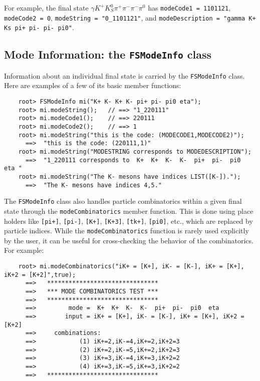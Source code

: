 \documentclass[11pt]{article}
\begin{document}
For example, the final state $\gamma K^+ K^0_S \pi^+ \pi^- \pi^- \pi^0$ has {\tt modeCode1 = 1101121}, {\tt modeCode2 = 0}, {\tt modeString = "0\_1101121"}, and {\tt modeDescription = "gamma K+ Ks pi+ pi- pi- pi0"}. 

\subsection{Mode Information: the {\tt FSModeInfo} class}
\label{sec:modeinfo}

Information about an individual final state is carried by the {\tt FSModeInfo} class.  Here are examples of a few of its basic member functions:
\begin{verbatim}
    root> FSModeInfo mi("K+ K- K+ K- pi+ pi- pi0 eta");
    root> mi.modeString();   // ==> "1_220111"
    root> mi.modeCode1();    // ==> 220111
    root> mi.modeCode2();    // ==> 1
    root> mi.modeString("this is the code: (MODECODE1,MODECODE2)");
      ==>  "this is the code: (220111,1)" 
    root> mi.modeString("MODESTRING corresponds to MODEDESCRIPTION");
      ==>  "1_220111 corresponds to  K+  K+  K-  K-  pi+  pi-  pi0  eta "
    root> mi.modeString("The K- mesons have indices LIST([K-]).");
      ==>  "The K- mesons have indices 4,5."
\end{verbatim}

The {\tt FSModeInfo} class also handles particle combinatorics within a given final state through the {\tt modeCombinatorics} member function.  This is done using place holders like {\tt [pi+]}, {\tt [pi-]}, {\tt [K+]}, {\tt [K+3]}, {\tt [tk+]}, {\tt [pi0]}, etc., which are replaced by particle indices.  While the {\tt modeCombinatorics} function is rarely used explicitly by the user, it can be useful for cross-checking the behavior of the combinatorics. For example:
\begin{verbatim}
    root> mi.modeCombinatorics("iK+ = [K+], iK- = [K-], iK+ = [K+], iK+2 = [K+2]",true);
      ==>   *******************************
      ==>   *** MODE COMBINATORICS TEST ***
      ==>   *******************************
      ==>         mode =  K+  K+  K-  K-  pi+  pi-  pi0  eta 
      ==>        input = iK+ = [K+], iK- = [K-], iK+ = [K+], iK+2 = [K+2]
      ==>     combinations:
      ==>            (1) iK+=2,iK-=4,iK+=2,iK+2=3
      ==>            (2) iK+=2,iK-=5,iK+=2,iK+2=3
      ==>            (3) iK+=3,iK-=4,iK+=3,iK+2=2
      ==>            (4) iK+=3,iK-=5,iK+=3,iK+2=2
      ==>   *******************************
\end{verbatim}
\end{document}
